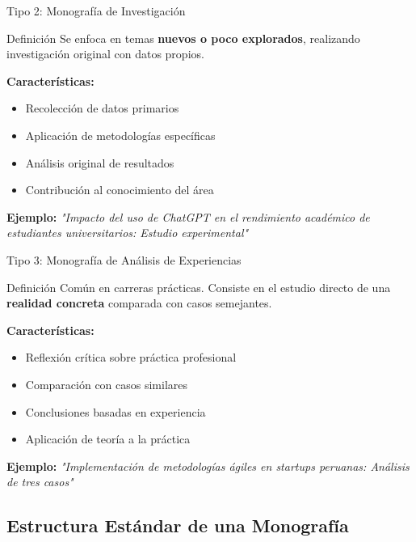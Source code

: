 \documentclass[xcolor=table,aspectratio=169,11pt]{beamer}
\begin{document}
	\begin{frame}{Tipo 2: Monografía de Investigación}
		\begin{block}{Definición}
			Se enfoca en temas \textbf{nuevos o poco explorados}, realizando investigación original con datos propios.
		\end{block}
		
		\textbf{Características:}
		\begin{itemize}
			\item Recolección de datos primarios
			\item Aplicación de metodologías específicas
			\item Análisis original de resultados
			\item Contribución al conocimiento del área
		\end{itemize}
		
		\vspace{0.3cm}
		\textbf{Ejemplo:} \textit{"Impacto del uso de ChatGPT en el rendimiento académico de estudiantes universitarios: Estudio experimental"}
	\end{frame}
	
	\begin{frame}{Tipo 3: Monografía de Análisis de Experiencias}
		\begin{block}{Definición}
			Común en carreras prácticas. Consiste en el estudio directo de una \textbf{realidad concreta} comparada con casos semejantes.
		\end{block}
		
		\textbf{Características:}
		\begin{itemize}
			\item Reflexión crítica sobre práctica profesional
			\item Comparación con casos similares
			\item Conclusiones basadas en experiencia
			\item Aplicación de teoría a la práctica
		\end{itemize}
		
		\vspace{0.3cm}
		\textbf{Ejemplo:} \textit{"Implementación de metodologías ágiles en startups peruanas: Análisis de tres casos"}
	\end{frame}
	
	\subsection{Estructura Estándar de una Monografía}
	
\end{document}
